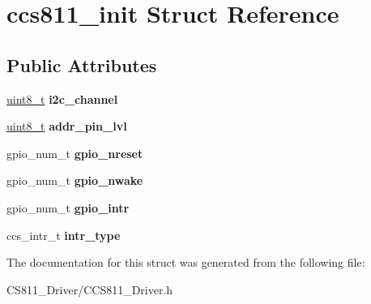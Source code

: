 \hypertarget{structccs811__init}{}\section{ccs811\+\_\+init Struct Reference}
\label{structccs811__init}
\subsection*{Public Attributes}
\begin{DoxyCompactItemize}
\item 
\mbox{\label{structccs811__init_ac0ca95c347d9e3552976d2924c52222f}} 
\hyperlink{vl53l0x__types_8h_aba7bc1797add20fe3efdf37ced1182c5}{uint8\+\_\+t} {\bfseries i2c\+\_\+channel}
\item 
\mbox{\label{structccs811__init_a1889e97a73220b40b154214acb5c83e1}} 
\hyperlink{vl53l0x__types_8h_aba7bc1797add20fe3efdf37ced1182c5}{uint8\+\_\+t} {\bfseries addr\+\_\+pin\+\_\+lvl}
\item 
\mbox{\label{structccs811__init_a4329034476050681d6285d192e9a4ac0}} 
gpio\+\_\+num\+\_\+t {\bfseries gpio\+\_\+nreset}
\item 
\mbox{\label{structccs811__init_af74371edbfcf5dda7d71e6b534f29117}} 
gpio\+\_\+num\+\_\+t {\bfseries gpio\+\_\+nwake}
\item 
\mbox{\label{structccs811__init_ae633ecbb376d84d81e17a2bf441b3d02}} 
gpio\+\_\+num\+\_\+t {\bfseries gpio\+\_\+intr}
\item 
\mbox{\label{structccs811__init_ae145b82b85dea491b788662bd05f6044}} 
ccs\+\_\+intr\+\_\+t {\bfseries intr\+\_\+type}
\end{DoxyCompactItemize}


The documentation for this struct was generated from the following file\+:\begin{DoxyCompactItemize}
\item 
C\+S811\+\_\+\+Driver/C\+C\+S811\+\_\+\+Driver.\+h\end{DoxyCompactItemize}
